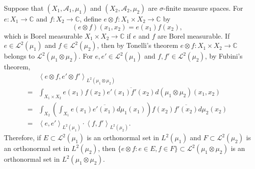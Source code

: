 \documentclass{article}
\newcommand{\inner}[2]{\left\langle #1, #2 \right\rangle}
\theoremstyle{definition}
\begin{document}
Suppose that $(X_1,\mathscr{A}_1,\mu_1)$ and $(X_2,\mathscr{A}_2,\mu_2)$ are 
$\sigma$-finite measure spaces.
For $e:X_1 \to \mathbb{C}$ and $f:X_2 \to \mathbb{C}$, define $e \otimes f:X_1 \times X_2 \to \mathbb{C}$ by
\[
(e \otimes f)(x_1,x_2) = e(x_1) f(x_2),
\]
 which is Borel measurable $X_1 \times X_2 \to \mathbb{C}$ if $e$
and $f$ are Borel measurable.
If $e \in \mathscr{L}^2(\mu_1)$ and $f \in \mathscr{L}^2(\mu_2)$, then by
Tonelli's theorem $e \otimes f:X_1 \times X_2 \to \mathbb{C}$ belongs to
$\mathscr{L}^2(\mu_1 \otimes \mu_2)$. 
For $e,e' \in \mathscr{L}^2(\mu_1)$ and $f,f' \in \mathscr{L}^2(\mu_2)$, by Fubini's theorem,
\[
\begin{split}
&\inner{e \otimes f}{e' \otimes f'}_{L^2(\mu_1 \otimes \mu_2)}\\
=&\int_{X_1 \times X_2} e(x_1) f(x_2) \overline{e'(x_1) f'(x_2)} d(\mu_1 \otimes \mu_2)(x_1,x_2)\\
=&\int_{X_2} \left( \int_{X_1} e(x_1) \overline{e'(x_1)} d\mu_1(x_1) \right)  f(x_2) \overline{f'(x_2)}   d\mu_2(x_2)\\
=&\inner{e}{e'}_{L^2(\mu_1)} \cdot \inner{f}{f'}_{L^2(\mu_2)}.
\end{split}
\]
Therefore, if 
$E \subset \mathscr{L}^2(\mu_1)$ is an orthonormal set in $L^2(\mu_1)$
and $F \subset \mathscr{L}^2(\mu_2)$ is an orthonormal set in $L^2(\mu_2)$, then
$\{e \otimes f: e \in E, f \in F\} \subset \mathscr{L}^2(\mu_1 \otimes \mu_2)$ is an orthonormal set
in $L^2(\mu_1 \otimes \mu_2)$. 
\end{document}
